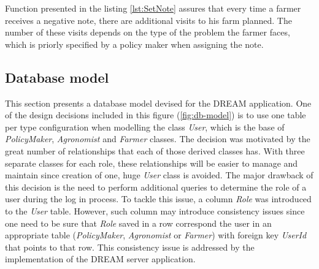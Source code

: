 

Function presented in the listing \ref{lst:SetNote} assures that every time a farmer receives a negative note, there are additional visits to his farm planned. The number of these visits depends on the type of the problem the farmer faces, which is priorly specified by a policy maker when assigning the note.



\subsection{Database model}

This section presents a database model devised for the DREAM application. One of the design decisions included in this figure (\ref{fig:db-model}) is to use one table per type configuration \cite{ef-Inheritance} when modelling the class \textit{User}, which is the base of \textit{PolicyMaker}, \textit{Agronomist} and \textit{Farmer} classes. The decision was motivated by the great number of relationships that each of those derived classes has. With three separate classes for each role, these relationships will be easier to manage and maintain since creation of one, huge \textit{User} class is avoided. The major drawback of this decision is the need to perform additional queries to determine the role of a user during the log in process. To tackle this issue, a column \textit{Role} was introduced to the \textit{User} table. However, such column may introduce consistency issues since one need to be sure that \textit{Role} saved in a row correspond the user in an appropriate table (\textit{PolicyMaker}, \textit{Agronomist} or \textit{Farmer}) with foreign key \textit{UserId} that points to that row. This consistency issue is addressed by the implementation of the DREAM server application.


